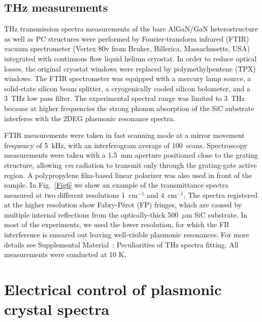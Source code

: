 \documentclass[%
 reprint,
 amsmath,amssymb,
 aps,
]{revtex4-2}
\begin{document}
\subsection{THz measurements}

THz transmission spectra measurements of the bare AlGaN/GaN heterostructure as well as PC structures were performed by Fourier-transform infrared (FTIR) vacuum spectrometer (Vertex 80v from Bruker, Billerica, Massachusetts, USA) integrated with continuous flow liquid helium cryostat. In order to reduce optical losses, the original cryostat windows were replaced by polymethylpentene (TPX) windows. The FTIR spectrometer was equipped with a mercury lamp source, a solid-state silicon beam splitter, a cryogenically cooled silicon bolometer, and a 3~THz low pass filter. The experimental spectral range was limited to 3~THz because at higher frequencies the strong phonon absorption of the SiC substrate~\cite{Tarekegne2019} interferes with the 2DEG plasmonic resonance spectra.

FTIR measurements were taken in fast scanning mode at a mirror movement frequency of 5~kHz, with an interferogram average of 100~scans. 
Spectroscopy measurements were taken with a 1.5~mm aperture positioned close to the grating structure, allowing \textit{em} radiation to transmit only through the grating-gate active region. 
A polypropylene film-based linear polarizer was also used in front of the sample. 
In Fig.~\ref{Fig6} we show an example of the transmittance spectra measured at two different resolutions 1~cm$^{-1}$ and 4~cm$^{-1}$. 
The spectra registered at the higher resolution show Fabry-Pérot (FP) fringes, which are caused by multiple internal reflections from the optically-thick 500~$\mu$m SiC substrate.  
In most of the experiments, we used the lower resolution, for which the FB interference is smeared out leaving well-visible plasmonic resonances.
For more details see Supplemental Material~\cite{suppl}: Peculiarities of THz spectra fitting.
All measurements were conducted at 10 K.

\section{Electrical control of plasmonic crystal spectra}\label{Sec4}
\end{document}
